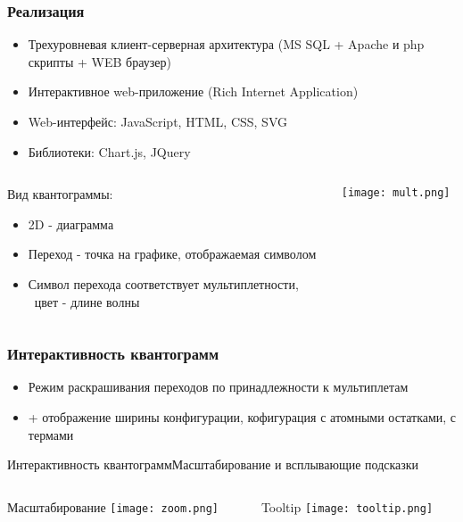 \documentclass{beamer}
\begin{document}
\begin{frame}
\frametitle{Реализация}
    \begin{itemize}
        \item Трехуровневая клиент-серверная архитектура (MS SQL + Apache и php скрипты + WEB браузер)
        \item Интерактивное web-приложение (Rich Internet Application)
        \item Web-интерфейс: JavaScript, HTML, CSS, SVG
        \item Библиотеки: Chart.js, JQuery
    \end{itemize}
    \begin{columns}
    \begin{column}{0.7\textwidth}
       Вид квантограммы:
    \begin{itemize}
        \item 2D - диаграмма
        \item Переход - точка на графике, отображаемая символом
        \item Символ перехода соответствует мультиплетности, 
        \\~цвет - длине волны
    \end{itemize}
    \end{column}
    \begin{column}{0.25\textwidth}
      \texttt{[image: mult.png]}
    \end{column}
  \end{columns}
\end{frame}

\begin{frame}
\frametitle{Интерактивность квантограмм}
    \begin{itemize}
       
      
        \item Режим раскрашивания переходов по принадлежности к мультиплетам
        
        \item + отображение ширины конфигурации, кофигурация с атомными остатками, с термами
    \end{itemize}
\end{frame}

\begin{frame}{Интерактивность квантограмм}{Масштабирование и всплывающие подсказки}
    \begin{columns}
    \begin{column}{0.5\textwidth}
         Масштабирование
         \texttt{[image: zoom.png]}
    \end{column}
    \begin{column}{0.5\textwidth}
      Tooltip
      \texttt{[image: tooltip.png]}
    \end{column}
  \end{columns}
\end{frame}
\end{document}
